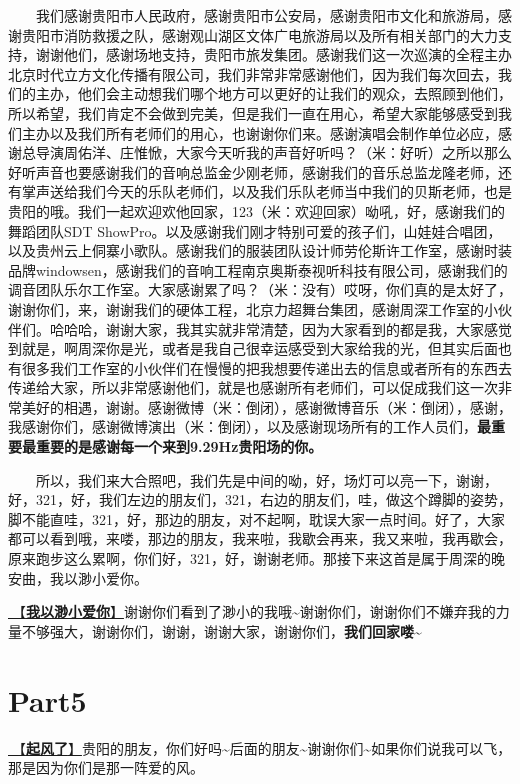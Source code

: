 \documentclass[]{ctexbook}
\begin{document}
  我们感谢贵阳市人民政府，感谢贵阳市公安局，感谢贵阳市文化和旅游局，感谢贵阳市消防救援之队，感谢观山湖区文体广电旅游局以及所有相关部门的大力支持，谢谢他们，感谢场地支持，贵阳市旅发集团。感谢我们这一次巡演的全程主办北京时代立方文化传播有限公司，我们非常非常感谢他们，因为我们每次回去，我们的主办，他们会主动想我们哪个地方可以更好的让我们的观众，去照顾到他们，所以希望，我们肯定不会做到完美，但是我们一直在用心，希望大家能够感受到我们主办以及我们所有老师们的用心，也谢谢你们来。感谢演唱会制作单位必应，感谢总导演周佑洋、庄惟惞，大家今天听我的声音好听吗？（米：好听）之所以那么好听声音也要感谢我们的音响总监金少刚老师，感谢我们的音乐总监龙隆老师，还有掌声送给我们今天的乐队老师们，以及我们乐队老师当中我们的贝斯老师，也是贵阳的哦。我们一起欢迎欢他回家，123（米：欢迎回家）呦吼，好，感谢我们的舞蹈团队SDT ShowPro。以及感谢我们刚才特别可爱的孩子们，山娃娃合唱团，以及贵州云上侗寨小歌队。感谢我们的服装团队设计师劳伦斯许工作室，感谢时装品牌windowsen，感谢我们的音响工程南京奥斯泰视听科技有限公司，感谢我们的调音团队乐尔工作室。大家感谢累了吗？（米：没有）哎呀，你们真的是太好了，谢谢你们，来，谢谢我们的硬体工程，北京力超舞台集团，感谢周深工作室的小伙伴们。哈哈哈，谢谢大家，我其实就非常清楚，因为大家看到的都是我，大家感觉到就是，啊周深你是光，或者是我自己很幸运感受到大家给我的光，但其实后面也有很多我们工作室的小伙伴们在慢慢的把我想要传递出去的信息或者所有的东西去传递给大家，所以非常感谢他们，就是也感谢所有老师们，可以促成我们这一次非常美好的相遇，谢谢。感谢微博（米：倒闭），感谢微博音乐（米：倒闭），感谢，我感谢你们，感谢微博演出（米：倒闭），以及感谢现场所有的工作人员们，\textbf{最重要最重要的是感谢每一个来到9.29Hz贵阳场的你。}

  所以，我们来大合照吧，我们先是中间的呦，好，场灯可以亮一下，谢谢，好，321，好，我们左边的朋友们，321，右边的朋友们，哇，做这个蹲脚的姿势，脚不能直哇，321，好，那边的朋友，对不起啊，耽误大家一点时间。好了，大家都可以看到哦，来喽，那边的朋友，我来啦，我歇会再来，我又来啦，我再歇会，原来跑步这么累啊，你们好，321，好，谢谢老师。那接下来这首是属于周深的晚安曲，我以渺小爱你。

\hyperref[loving-you-in-my-humble-way]{🎵【\textbf{我以渺小爱你}】}谢谢你们看到了渺小的我哦\textasciitilde 谢谢你们，谢谢你们不嫌弃我的力量不够强大，谢谢你们，谢谢，谢谢大家，谢谢你们，\textbf{我们回家喽\textasciitilde{}}

\section{Part5}\label{guiyang-20240713-part5}

\hyperref[the-wind-rises]{🎵【\textbf{起风了}】}贵阳的朋友，你们好吗\textasciitilde 后面的朋友\textasciitilde 谢谢你们\textasciitilde 如果你们说我可以飞，那是因为你们是那一阵爱的风。
\end{document}
